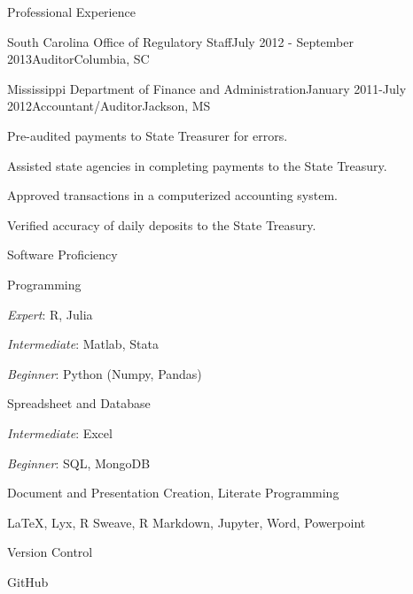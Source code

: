 \documentclass{resume} %
\begin{document}
\begin{rSection}{Professional Experience}
\begin{rSubsection}{South Carolina Office of Regulatory Staff}{July 2012 - September 2013}{Auditor}{Columbia, SC}
\end{rSubsection}

\begin{rSubsection}{Mississippi Department of Finance and Administration}{January 2011-July 2012}{Accountant/Auditor}{Jackson, MS}
    \item Pre-audited payments to State Treasurer for errors.
    \item Assisted state agencies in completing payments to the State Treasury.
    \item Approved transactions in a computerized accounting system.
    \item Verified accuracy of daily deposits to the State Treasury.

\end{rSubsection}
\end{rSection}


\begin{rSection}{Software Proficiency}

\begin{rSubsection}{Programming}{}{}{}
    \item {\em Expert}: R, Julia
    \item {\em Intermediate}: Matlab, Stata 
    \item {\em Beginner}: Python (Numpy, Pandas)
\end{rSubsection}

\begin{rSubsection}{Spreadsheet and Database}{}{}{}
    \item {\em Intermediate}: Excel 
    \item {\em Beginner}: SQL, MongoDB
\end{rSubsection}

\begin{rSubsection}{Document and Presentation Creation, Literate Programming}{}{}{}
    \item \LaTeX, Lyx, R Sweave, R Markdown, Jupyter, Word, Powerpoint
\end{rSubsection}

\newpage

\begin{rSubsection}{Version Control}{}{}{}
    \item GitHub
\end{rSubsection}

\end{rSection}
\end{document}

